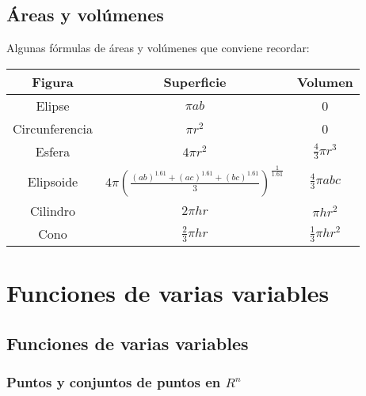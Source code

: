 \documentclass[twoside]{article}
\numberwithin{equation}{section}
\numberwithin{figure}{section}
\numberwithin{table}{section}
\begin{document}
		\subsection{Áreas y volúmenes}
		
			Algunas fórmulas de áreas y volúmenes que conviene recordar:
				\begin{center}
					\begin{tabular}{c c c}
						 Figura & Superficie &  Volumen\\ 
						 \hline
						 Elipse & $\pi ab$ & 0 \\
						 Circunferencia & $\pi r^2$ & 0 \\
						 Esfera & $4\pi r^2$ & $\frac{4}{3}\pi r^3$ \\
						 Elipsoide & $4\pi \left(\frac{(ab)^{1.61}+(ac)^{1.61}+(bc)^{1.61}}{3}\right)^\frac{1}{1.61}$ & $\frac{4}{3}\pi abc$ \\
						 Cilindro & $2\pi h r$ & $\pi h r^2$\\
						 Cono & $\frac{2}{3}\pi h r$ & $\frac{1}{3}\pi h r^2$ \\					
					\end{tabular} 
				\end{center}				

	\section{Funciones de varias variables}
		\subsection{Funciones de varias variables}
			
			\subsubsection{Puntos y conjuntos de puntos en $R^n$}
			
\end{document}
